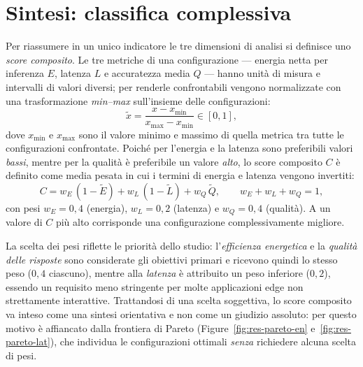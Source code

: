 \section{Sintesi: classifica complessiva}
\label{sec:composito}

Per riassumere in un unico indicatore le tre dimensioni di analisi si definisce uno
\emph{score composito}. Le tre metriche di una configurazione --- energia netta per
inferenza $E$, latenza $L$ e accuratezza media $Q$ --- hanno unità di misura e
intervalli di valori diversi; per renderle confrontabili vengono normalizzate con
una trasformazione \emph{min--max} sull'insieme delle configurazioni:
\begin{equation}
    \tilde{x} = \frac{x - x_{\min}}{x_{\max} - x_{\min}} \in [0, 1],
    \label{eq:minmax}
\end{equation}
dove $x_{\min}$ e $x_{\max}$ sono il valore minimo e massimo di quella metrica tra
tutte le configurazioni confrontate. Poiché per l'energia e la latenza sono
preferibili valori \emph{bassi}, mentre per la qualità è preferibile un valore
\emph{alto}, lo score composito $C$ è definito come media pesata in cui i termini
di energia e latenza vengono invertiti:
\begin{equation}
    C = w_E\,(1 - \tilde{E}) + w_L\,(1 - \tilde{L}) + w_Q\,\tilde{Q},
    \qquad w_E + w_L + w_Q = 1,
    \label{eq:composito}
\end{equation}
con pesi $w_E = 0{,}4$ (energia), $w_L = 0{,}2$ (latenza) e $w_Q = 0{,}4$
(qualità). A un valore di $C$ più alto corrisponde una configurazione
complessivamente migliore.

La scelta dei pesi riflette le priorità dello studio: l'\emph{efficienza
energetica} e la \emph{qualità delle risposte} sono considerate gli obiettivi
primari e ricevono quindi lo stesso peso ($0{,}4$ ciascuno), mentre alla
\emph{latenza} è attribuito un peso inferiore ($0{,}2$), essendo un requisito meno
stringente per molte applicazioni edge non strettamente interattive. Trattandosi
di una scelta soggettiva, lo score composito va inteso come una sintesi
orientativa e non come un giudizio assoluto: per questo motivo è affiancato dalla
frontiera di Pareto (Figure~\ref{fig:res-pareto-en} e~\ref{fig:res-pareto-lat}),
che individua le configurazioni ottimali \emph{senza} richiedere alcuna scelta di
pesi.


